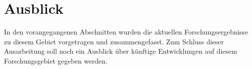 \section{Ausblick}
\label{sec:ausblick}
In den vorangegangenen Abschnitten wurden die aktuellen Forschungsergebnisse zu diesem Gebiet vorgetragen und zusammengefasst.
Zum Schluss dieser Ausarbeitung soll noch ein Ausblick über künftige Entwicklungen auf diesem Forschungsgebiet gegeben werden.
